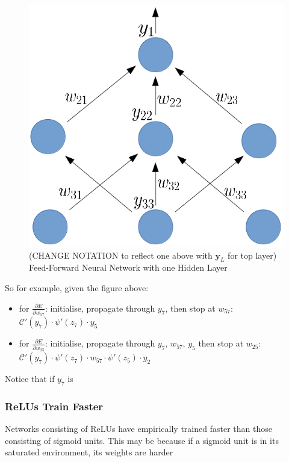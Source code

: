 \documentclass[a4paper,11pt]{article}
\begin{document}
\begin{figure}[h!]
	\centering
	\includegraphics[scale=0.28]{images/gradient_propagates.png}
	\caption{(CHANGE NOTATION to reflect one above with $\textbf{y}_L$ for top layer) Feed-Forward Neural Network with one Hidden Layer}
\end{figure}

So for example, given the figure above:
\begin{itemize}
\renewcommand\labelitemi{--}
\item for $\frac{\partial{E}}{\partial{w_{57}}}$: initialise, propagate through $y_{7}$, then stop at $w_{57}$:
 $ \mathcal{C}'(y_{7}) \cdot \psi'(z_7) \cdot y_5$ 
\item for $\frac{\partial{E}}{\partial{w_{25}}}$: initialise, propagate through $y_{7}$, $w_{57}$, $y_{5}$ then stop at $w_{25}$:
 $\mathcal{C}'(y_{7}) \cdot \psi'(z_7) \cdot w_{57} \cdot \psi'(z_5) \cdot y_2$ \\
\end{itemize}

Notice that if $y_7$ is 

\subsubsection{ReLUs Train Faster}

Networks consisting of ReLUs have empirically trained faster than those consisting of sigmoid units. This may be because if a sigmoid unit is in its saturated environment, its weights are harder 
\end{document}
